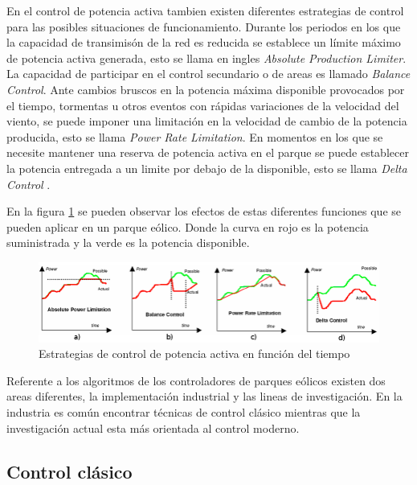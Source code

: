\documentclass{book}
\begin{document}
En el control de potencia activa tambien existen diferentes estrategias de control para las posibles situaciones de funcionamiento. Durante los periodos en los que la capacidad de transimis\'on de la red es reducida se establece un l\'imite m\'aximo de potencia activa generada, esto se llama en ingles \emph{Absolute Production Limiter}. La capacidad de participar en el control secundario o de areas es llamado \emph{Balance Control}. Ante cambios bruscos en la potencia m\'axima disponible provocados por el tiempo, tormentas u otros eventos con r\'apidas variaciones de la velocidad del viento, se puede imponer una limitaci\'on en la velocidad de cambio de la potencia producida, esto se llama \emph{Power Rate Limitation}. En momentos en los que se necesite mantener una reserva de potencia activa en el parque se puede establecer la potencia entregada a un limite por debajo de la disponible, esto se llama \emph{Delta Control}  \cite{ActiveStrategies}. \par

En la figura \ref{PowerLimits} se pueden observar los efectos de estas diferentes funciones que se pueden aplicar en un parque e\'olico. Donde la curva en rojo es la potencia suministrada y la verde es la potencia disponible. \par 


\begin{figure}[h!]
\centering
\includegraphics[width=1\textwidth]{PowerLimits.PNG}
\caption{Estrategias de control de potencia activa en funci\'on del tiempo}
\label{PowerLimits}
\end{figure}

Referente a los algoritmos de los controladores de parques e\'olicos existen dos areas diferentes, la implementaci\'on industrial y las lineas de investigaci\'on. En la industria es com\'un encontrar t\'ecnicas de control cl\'asico mientras que la investigaci\'on actual esta m\'as orientada al control moderno. \par 

	\subsection{Control cl\'asico}
\end{document}
